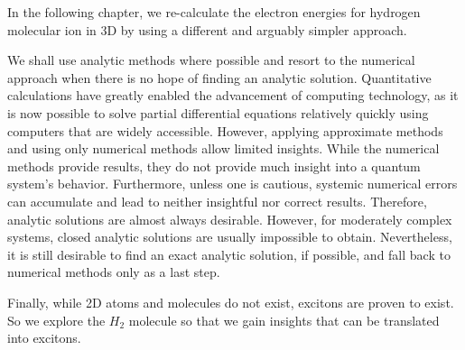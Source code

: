In the following chapter, we re-calculate the electron energies for hydrogen molecular ion in 3D by using a different and arguably simpler approach.

We shall use analytic methods where possible and resort to the numerical approach when there is no hope of finding an analytic solution.
Quantitative calculations have greatly enabled the advancement of computing technology, as it is now possible to solve partial differential equations relatively quickly using computers that are widely accessible.  However, applying approximate methods and using only numerical methods allow limited insights. While the numerical methods provide results, they do not provide much insight into a quantum system's behavior. Furthermore, unless one is cautious, systemic numerical errors can accumulate and lead to neither insightful nor correct results. Therefore, analytic solutions are almost always desirable. However, for moderately complex systems, closed analytic solutions are usually impossible to obtain. Nevertheless, it is still desirable to find an exact analytic solution,  if possible, and fall back to numerical methods only as a last step. 

Finally, while 2D atoms and molecules do not exist, excitons are proven to exist. So we explore the $ H_2 $ molecule so that we gain insights that can be translated into excitons.
